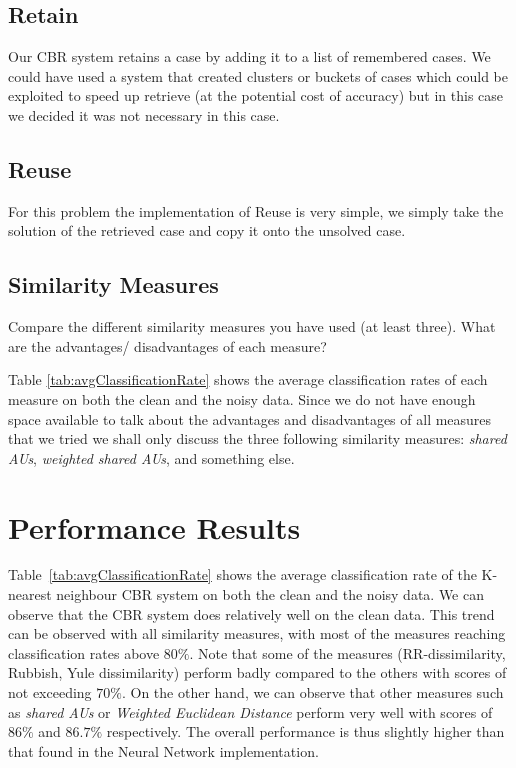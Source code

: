 \documentclass[10pt,a4paper]{article}
\begin{document}
\subsection{Retain}
Our CBR system retains a case by adding it to a list of remembered cases.
We could have used a system that created clusters or buckets of cases which could be exploited to speed up retrieve (at the potential cost of accuracy) but in this case we decided it was not necessary in this case.

\subsection{Reuse}
For this problem the implementation of Reuse is very simple, we simply take the solution of the retrieved case and copy it onto the unsolved case.

\subsection{Similarity Measures}
Compare the different similarity measures you have used (at least three). What are the advantages/ disadvantages of each measure?

Table \ref{tab:avgClassificationRate} shows the average classification rates of each measure on both the clean and the noisy data. 
Since we do not have enough space available to talk about the advantages and disadvantages of all measures that we tried we shall only discuss the three following similarity measures: \emph{shared AUs}, \emph{weighted shared AUs}, and something else.

\section{Performance Results}

Table~\ref{tab:avgClassificationRate} shows the average classification rate of the K-nearest neighbour CBR system on both the clean and the noisy data. We can observe that the CBR system does relatively well on the clean data. This trend can be observed with all similarity measures, with most of the measures reaching classification rates above $80\%$. Note that some of the measures (RR-dissimilarity, Rubbish, Yule dissimilarity) perform badly compared to the others with scores of not exceeding $70\%$. On the other hand, we can observe that other measures such as \emph{shared AUs} or \emph{Weighted Euclidean Distance} perform very well with scores of $86\%$ and $86.7\%$ respectively. The overall performance is thus slightly higher than that found in the Neural Network implementation.
\end{document}
